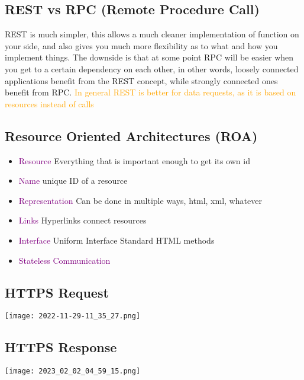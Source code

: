 \documentclass[main.tex,fontsize=6pt,paper=a4,paper=landscape,DIV=calc,]{scrartcl}
\begin{document}
\begin{multicols*}{4}
\subsection{REST vs RPC (Remote Procedure Call)}  
REST is much simpler, this allows a much cleaner implementation of function on your side, and also gives you much more flexibility as to what and how you implement things. \newline
The downside is that at some point RPC will be easier when you get to a certain dependency on each other, in other words, loosely connected applications benefit from the REST concept, while strongly connected ones benefit from RPC.\newline 
\textcolor{orange}{In general REST is better for data requests, as it is based on resources instead of calls}

\subsection{Resource Oriented Architectures (ROA)}  

\begin{itemize}
\item \textcolor{purple}{Resource}\newline
  Everything that is important enough to get its own id
\item \textcolor{purple}{Name}\newline
  unique ID of a resource
\item \textcolor{purple}{Representation}\newline
  Can be done in multiple ways, html, xml, whatever
\item \textcolor{purple}{Links}\newline
  Hyperlinks connect resources
\item \textcolor{purple}{Interface}\newline
  Uniform Interface\newline
  Standard HTML methods
\item \textcolor{purple}{Stateless Communication}
\end{itemize} 

\subsection{HTTPS Request}  
\texttt{[image: 2022-11-29-11\_35\_27.png]}

\subsection{HTTPS Response}
\texttt{[image: 2023\_02\_02\_04\_59\_15.png]}


\end{multicols*}
\end{document}
